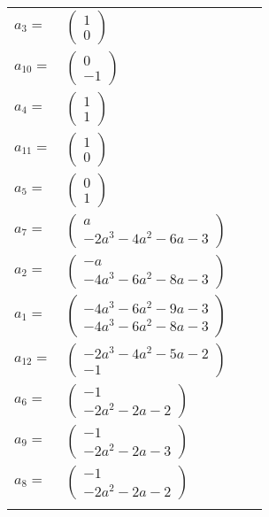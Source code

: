 \documentclass[1p]{elsarticle_modified}
\theoremstyle{definition}
\begin{document}
\begin{tabular}{m{7pt} m{180pt} m{7pt} m{180pt} }
\flushright $a_{3}=$&$\begin{pmatrix}1\\0\end{pmatrix}$ \\
\flushright $a_{10}=$&$\begin{pmatrix}0\\-1\end{pmatrix}$ \\
\flushright $a_{4}=$&$\begin{pmatrix}1\\1\end{pmatrix}$ \\
\flushright $a_{11}=$&$\begin{pmatrix}1\\0\end{pmatrix}$ \\
\flushright $a_{5}=$&$\begin{pmatrix}0\\1\end{pmatrix}$ \\
\flushright $a_{7}=$&$\begin{pmatrix}a\\-2 a^3-4 a^2-6 a-3\end{pmatrix}$ \\
\flushright $a_{2}=$&$\begin{pmatrix}- a\\-4 a^3-6 a^2-8 a-3\end{pmatrix}$ \\
\flushright $a_{1}=$&$\begin{pmatrix}-4 a^3-6 a^2-9 a-3\\-4 a^3-6 a^2-8 a-3\end{pmatrix}$ \\
\flushright $a_{12}=$&$\begin{pmatrix}-2 a^3-4 a^2-5 a-2\\-1\end{pmatrix}$ \\
\flushright $a_{6}=$&$\begin{pmatrix}-1\\-2 a^2-2 a-2\end{pmatrix}$ \\
\flushright $a_{9}=$&$\begin{pmatrix}-1\\-2 a^2-2 a-3\end{pmatrix}$ \\
\flushright $a_{8}=$&$\begin{pmatrix}-1\\-2 a^2-2 a-2\end{pmatrix}$\\&\end{tabular}
\end{document}
